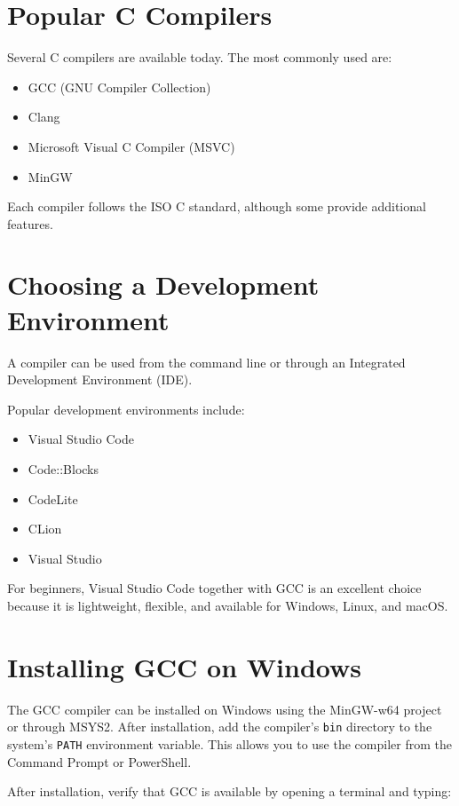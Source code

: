 \documentclass[12pt,openany]{book}
\begin{document}
\section{Popular C Compilers}

Several C compilers are available today. The most commonly used are:

\begin{itemize}
    \item GCC (GNU Compiler Collection)
    \item Clang
    \item Microsoft Visual C Compiler (MSVC)
    \item MinGW
\end{itemize}

Each compiler follows the ISO C standard, although some provide additional features.

\section{Choosing a Development Environment}

A compiler can be used from the command line or through an Integrated Development Environment (IDE).

Popular development environments include:

\begin{itemize}
    \item Visual Studio Code
    \item Code::Blocks
    \item CodeLite
    \item CLion
    \item Visual Studio
\end{itemize}

For beginners, Visual Studio Code together with GCC is an excellent choice because it is lightweight, flexible, and available for Windows, Linux, and macOS.
\section{Installing GCC on Windows}

The GCC compiler can be installed on Windows using the MinGW-w64 project or through MSYS2. After installation, add the compiler's \texttt{bin} directory to the system's \texttt{PATH} environment variable. This allows you to use the compiler from the Command Prompt or PowerShell.

After installation, verify that GCC is available by opening a terminal and typing:
\end{document}
